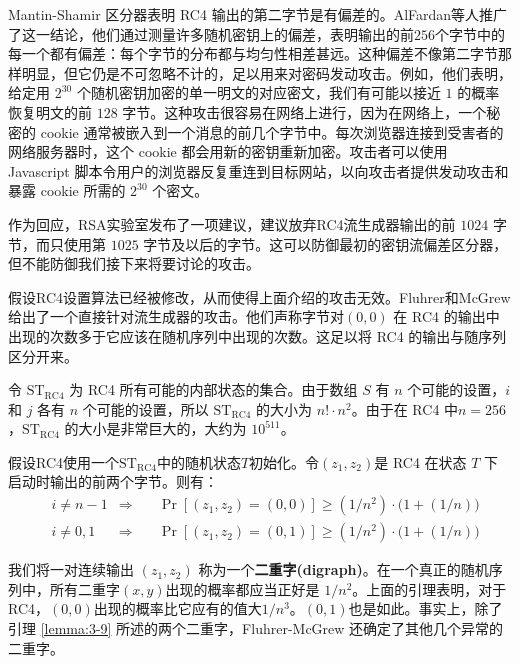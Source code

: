 Mantin-Shamir 区分器表明 RC4 输出的第二字节是有偏差的。AlFardan等人推广了这一结论，他们通过测量许多随机密钥上的偏差，表明输出的前$256$个字节中的每一个都有偏差：每个字节的分布都与均匀性相差甚远。这种偏差不像第二字节那样明显，但它仍是不可忽略不计的，足以用来对密码发动攻击。例如，他们表明，给定用 $2^{30}$ 个随机密钥加密的单一明文的对应密文，我们有可能以接近 $1$ 的概率恢复明文的前 $128$ 字节。这种攻击很容易在网络上进行，因为在网络上，一个秘密的 cookie 通常被嵌入到一个消息的前几个字节中。每次浏览器连接到受害者的网络服务器时，这个 cookie 都会用新的密钥重新加密。攻击者可以使用 Javascript 脚本令用户的浏览器反复重连到目标网站，以向攻击者提供发动攻击和暴露 cookie 所需的 $2^{30}$ 个密文。

作为回应，RSA实验室发布了一项建议，建议放弃RC4流生成器输出的前 $1024$ 字节，而只使用第 $1025$ 字节及以后的字节。这可以防御最初的密钥流偏差区分器，但不能防御我们接下来将要讨论的攻击。

\begin{snote}[RC4流生成器中的偏差。]
假设RC4设置算法已经被修改，从而使得上面介绍的攻击无效。Fluhrer和McGrew给出了一个直接针对流生成器的攻击。他们声称字节对$(0,0)$ 在 RC4 的输出中出现的次数多于它应该在随机序列中出现的次数。这足以将 RC4 的输出与随序列区分开来。

令 $\mathrm{ST}_\mathrm{RC4}$ 为 RC4 所有可能的内部状态的集合。由于数组 $S$ 有 $n$ 个可能的设置，$i$ 和 $j$ 各有 $n$ 个可能的设置，所以 $\mathrm{ST}_\mathrm{RC4}$ 的大小为 $n!\cdot n^2$。由于在 RC4 中$n=256$，$\mathrm{ST}_\mathrm{RC4}$ 的大小是非常巨大的，大约为 $10^{511}$。
\end{snote}

\begin{lemma}
假设RC4使用一个$\mathrm{ST}_\mathrm{RC4}$中的随机状态$T$初始化。令$(z_1,z_2)$是 RC4 在状态 $T$ 下启动时输出的前两个字节。则有：
\[
\begin{aligned}\label{lemma:3-9}
& i\neq n−1 & \Longrightarrow & \quad\Pr[(z_1,z_2)=(0,0)]\geq(1/n^2)\cdot\big(1+(1/n)\big)\\
& i\neq 0,1 & \Longrightarrow & \quad\Pr[(z_1,z_2)=(0,1)]\geq(1/n^2)\cdot\big(1+(1/n)\big)
\end{aligned}
\]
\end{lemma}

我们将一对连续输出 $(z_1,z_2)$ 称为一个\textbf{二重字(digraph)}。在一个真正的随机序列中，所有二重字$(x,y)$出现的概率都应当正好是 $1/n^2$。上面的引理表明，对于RC4，$(0,0)$出现的概率比它应有的值大$1/n^3$。$(0,1)$也是如此。事实上，除了引理 \ref{lemma:3-9} 所述的两个二重字，Fluhrer-McGrew 还确定了其他几个异常的二重字。

